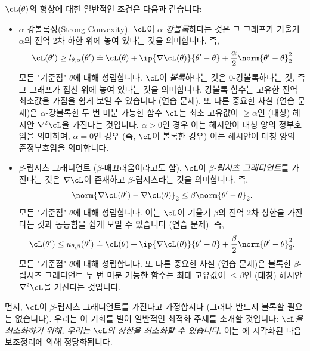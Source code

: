\documentclass[../../book-main_ko.tex]{subfiles}
\begin{document}
\(\cL(\theta)\)의 형상에 대한 일반적인 조건은 다음과 같습니다:
\begin{itemize}
    \item \(\alpha\)-강볼록성(Strong Convexity). \(\cL\)이 \textit{\(\alpha\)-강볼록}하다는 것은 그 그래프가 기울기 \(\alpha\)의 전역 2차 하한 위에 놓여 있다는 것을 의미합니다. 즉,
    \begin{equation}
        \cL(\theta^{\prime}) \geq l_{\theta, \alpha}(\theta^{\prime}) \doteq \cL(\theta) + \ip{\nabla \cL(\theta)}{\theta^{\prime} - \theta} + \frac{\alpha}{2}\norm{\theta^{\prime} - \theta}_{2}^{2}
    \end{equation}
    모든 "기준점" \(\theta\)에 대해 성립합니다. \(\cL\)이 \textit{볼록}하다는 것은 \(0\)-강볼록하다는 것, 즉 그 그래프가 접선 위에 놓여 있다는 것을 의미합니다. 강볼록 함수는 고유한 전역 최소값을 가짐을 쉽게 보일 수 있습니다 (연습 문제). 또 다른 중요한 사실 (연습 문제)은 \(\alpha\)-강볼록한 두 번 미분 가능한 함수 \(\cL\)는 최소 고유값이 \(\geq \alpha\)인 (대칭) 헤시안 \(\nabla^{2}\cL\)을 가진다는 것입니다. \(\alpha > 0\)인 경우 이는 헤시안이 대칭 양의 정부호임을 의미하며, \(\alpha = 0\)인 경우 (즉, \(\cL\)이 볼록한 경우) 이는 헤시안이 대칭 양의 준정부호임을 의미합니다.
    \item \(\beta\)-립시츠 그래디언트 (\(\beta\)-매끄러움이라고도 함). \(\cL\)이 \textit{\(\beta\)-립시츠 그래디언트}를 가진다는 것은 \(\nabla \cL\)이 존재하고 \(\beta\)-립시츠라는 것을 의미합니다. 즉,
    \begin{equation}
        \norm{\nabla \cL(\theta^{\prime}) - \nabla \cL(\theta)}_{2} \leq \beta \norm{\theta^{\prime} - \theta}_{2}.
    \end{equation}
    모든 "기준점" \(\theta\)에 대해 성립합니다. 이는 \(\cL\)이 기울기 \(\beta\)의 전역 2차 상한을 가진다는 것과 동등함을 쉽게 보일 수 있습니다 (연습 문제). 즉,
    \begin{equation}
        \cL(\theta^{\prime}) \leq u_{\theta, \beta}(\theta^{\prime}) \doteq \cL(\theta) + \ip{\nabla \cL(\theta)}{\theta^{\prime} - \theta} + \frac{\beta}{2}\norm{\theta^{\prime} - \theta}_{2}^{2}.
    \end{equation}
    모든 "기준점" \(\theta\)에 대해 성립합니다. 또 다른 중요한 사실 (연습 문제)은 볼록한 \(\beta\)-립시츠 그래디언트 두 번 미분 가능한 함수는 최대 고유값이 \(\leq \beta\)인 (대칭) 헤시안 \(\nabla^{2}\cL\)을 가진다는 것입니다.
\end{itemize}
먼저, \(\cL\)이 \(\beta\)-립시츠 그래디언트를 가진다고 가정합시다 (그러나 반드시 볼록할 필요는 없습니다). 우리는 이 기회를 빌어 일반적인 최적화 주제를 소개할 것입니다: \textit{\(\cL\)을 최소화하기 위해, 우리는 \(\cL\)의 상한을 최소화할 수 있습니다}. 이는 에 시각화된 다음 보조정리에 의해 정당화됩니다.
\end{document}
